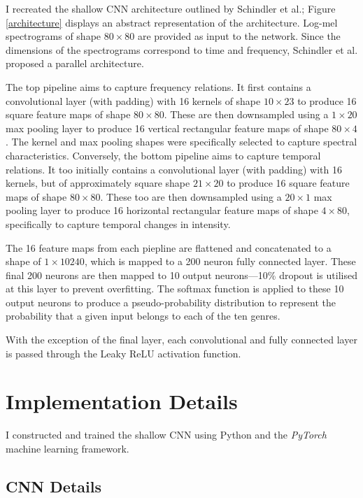 \documentclass[conference]{IEEEtran}
\begin{document}
I recreated the shallow CNN architecture outlined by Schindler et al.; Figure \ref{architecture} displays an abstract representation of the architecture.
Log-mel spectrograms of shape $80\times80$ are provided as input to the network.
Since the dimensions of the spectrograms correspond to time and frequency, Schindler et al. proposed a parallel architecture.

The top pipeline aims to capture frequency relations.
It first contains a convolutional layer (with padding) with 16 kernels of shape $10\times23$ to produce 16 square feature maps of shape $80\times80$.
These are then downsampled using a $1\times20$ max pooling layer to produce 16 vertical rectangular feature maps of shape $80\times4$.
The kernel and max pooling shapes were specifically selected to capture spectral characteristics.
Conversely, the bottom pipeline aims to capture temporal relations.
It too initially contains a convolutional layer (with padding) with 16 kernels, but of approximately square shape $21\times20$ to produce 16 square feature maps of shape $80\times80$.
These too are then downsampled using a $20\times1$ max pooling layer to produce 16 horizontal rectangular feature maps of shape $4\times80$, specifically to capture temporal changes in intensity.

The 16 feature maps from each piepline are flattened and concatenated to a shape of $1\times10240$, which is mapped to a 200 neuron fully connected layer.
These final 200 neurons are then mapped to 10 output neurons---10\% dropout is utilised at this layer to prevent overfitting.
The softmax function is applied to these 10 output neurons to produce a pseudo-probability distribution to represent the probability that a given input belongs to each of the ten genres.

With the exception of the final layer, each convolutional and fully connected layer is passed through the Leaky ReLU activation function.

\section{Implementation Details}

I constructed and trained the shallow CNN using Python and the \textit{PyTorch} \cite{PyTorch} machine learning framework.

\subsection{CNN Details}
\end{document}
